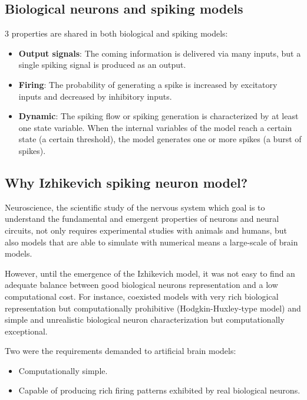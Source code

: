 \documentclass{article} %
\begin{document}
\subsection{Biological neurons and spiking models}
3 properties are shared in both biological and spiking models:
\begin{itemize}
    \item \textbf{Output signals}:
    The coming information is delivered via many inputs, but a single spiking signal is produced as an output.
    
    \item \textbf{Firing}:
    The probability of generating a spike is increased by excitatory inputs and decreased by inhibitory inputs. 
    
    \item \textbf{Dynamic}:
    The spiking flow or spiking generation is characterized by at least one state variable. When the internal variables of the model reach a certain state (a certain threshold), the model generates one or more spikes (a burst of spikes).
\end{itemize}

\subsection{Why Izhikevich spiking neuron model?}
Neuroscience, the scientific study of the nervous system which goal is to understand the fundamental and emergent properties of neurons and neural circuits, not only requires experimental studies with animals and humans, but also models that are able to simulate with numerical means a large-scale of brain models.

However, until the emergence of the Izhikevich model, it was not easy to find an adequate balance between good biological neurons representation and a low computational cost. For instance, coexisted models with very rich biological representation but computationally prohibitive (Hodgkin-Huxley-type model) and simple and unrealistic biological neuron characterization but computationally exceptional. 

Two were the requirements demanded to artificial brain models:
\begin{itemize}
    \item Computationally simple.
    
    \item Capable of producing rich firing patterns exhibited by real biological neurons.
\end{itemize}
 
\end{document}
